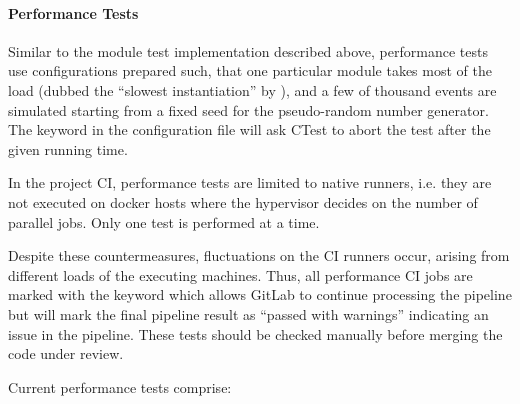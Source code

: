 \paragraph{Performance Tests}

Similar to the module test implementation described above, performance tests use configurations prepared such, that one particular module takes most of the load (dubbed the ``slowest instantiation'' by \apsq), and a few of thousand events are simulated starting from a fixed seed for the pseudo-random number generator.
The  keyword in the configuration file will ask CTest to abort the test after the given running time.

In the project CI, performance tests are limited to native runners, i.e. they are not executed on docker hosts where the hypervisor decides on the number of parallel jobs.
Only one test is performed at a time.

Despite these countermeasures, fluctuations on the CI runners occur, arising from different loads of the executing machines.
Thus, all performance CI jobs are marked with the  keyword which allows GitLab to continue processing the pipeline but will mark the final pipeline result as ``passed with warnings'' indicating an issue in the pipeline.
These tests should be checked manually before merging the code under review.

Current performance tests comprise:

